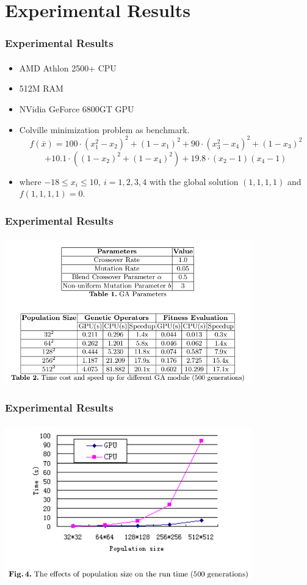 \section{Experimental Results}
\frame
{
\frametitle{Experimental Results}
\framesubtitle{}
\begin{itemize}
	\item AMD Athlon 2500+ CPU
	\item 512M RAM
	\item NVidia GeForce 6800GT GPU
	\item Colville minimization problem as benchmark.
	$$f(\bar{x}) = 100\cdot(x_{1}^{2} - x_{2})^{2} + (1-x_{1})^{2} + 90\cdot (x_{3}^{2} - x_{4})^{2} + (1 -x_{3})^{2}$$ 
	$$+ 10.1\cdot((1-x_{2})^{2} + (1-x_{4})^{2}) + 19.8\cdot (x_{2} -1)(x_{4} - 1)$$
	\item where $-18 \leq x_{i} \leq 10,\ i = 1,2,3,4$ with the global solution $(1,1,1,1)$ and $f(1,1,1,1)=0$.
\end{itemize}
}

\frame
{
\frametitle{Experimental Results}
\framesubtitle{}
\begin{center}
	\includegraphics[width=0.8\textwidth]{img/tables}
\end{center}
}

\frame
{
\frametitle{Experimental Results}
\framesubtitle{}
\begin{center}
	\includegraphics[width=0.8\textwidth]{img/grafico}
\end{center}
}
